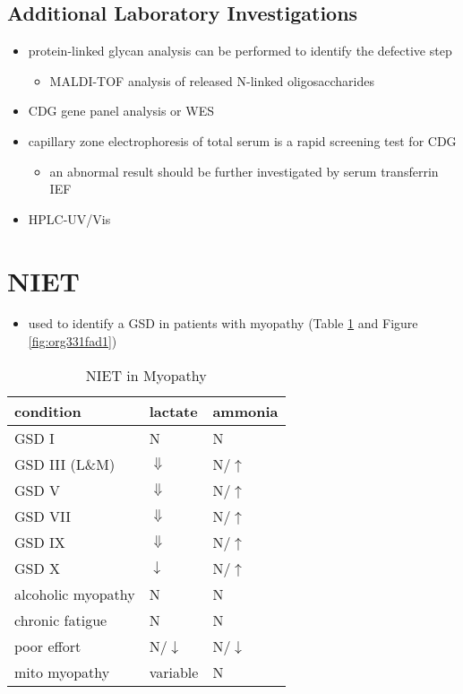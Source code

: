 \documentclass[12pt]{scrartcl}
\begin{document}
\subsection{Additional Laboratory Investigations}
\label{sec:orgbac8955}
\begin{itemize}
\item protein-linked glycan analysis can be performed to identify the defective step
\begin{itemize}
\item MALDI-TOF analysis of released N-linked oligosaccharides
\end{itemize}
\item CDG gene panel analysis or WES
\item capillary zone electrophoresis of total serum is a rapid screening
test for CDG
\begin{itemize}
\item an abnormal result should be further investigated by serum
transferrin IEF
\end{itemize}
\item HPLC-UV/Vis
\end{itemize}
\section{NIET}
\label{sec:orgef2dcdf}
\begin{itemize}
\item used to identify a GSD in patients with myopathy (Table
\ref{tab:orgff2c682} and Figure \ref{fig:org331fad1})
\end{itemize}

\begin{table}[htbp]
\caption{\label{tab:orgff2c682}NIET in Myopathy}
\centering
\begin{tabular}{lll}
condition & lactate & ammonia\\
\hline
GSD I & N & N\\
GSD III (L\&M) & \(\Downarrow\) & N/\(\uparrow\)\\
GSD V & \(\Downarrow\) & N/\(\uparrow\)\\
GSD VII & \(\Downarrow\) & N/\(\uparrow\)\\
GSD IX & \(\Downarrow\) & N/\(\uparrow\)\\
GSD X & \(\downarrow\) & N/\(\uparrow\)\\
alcoholic myopathy & N & N\\
chronic fatigue & N & N\\
poor effort & N/\(\downarrow\) & N/\(\downarrow\)\\
mito myopathy & variable & N\\
\end{tabular}
\end{table}
\end{document}
